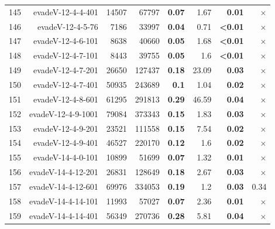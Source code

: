 \begin{longtable}{lrr@{\hskip 12pt}r@{\hskip 12pt}r@{\hskip 12pt}r@{\hskip 12pt}r@{\hskip 12pt}r}
145 & \multirow{1}{*}{evadeV-12-4-4-401} & \multirow{1}{*}{14507} & \multirow{1}{*}{67797} & \textbf{0.07} & 1.67 & \textbf{0.01} & $\times$ \\
146 & \multirow{1}{*}{evadeV-12-4-5-76} & \multirow{1}{*}{7186} & \multirow{1}{*}{33997} & \textbf{0.04} & 0.71 & \textbf{<0.01} & $\times$ \\
147 & \multirow{1}{*}{evadeV-12-4-6-101} & \multirow{1}{*}{8638} & \multirow{1}{*}{40660} & \textbf{0.05} & 1.68 & \textbf{<0.01} & $\times$ \\
148 & \multirow{1}{*}{evadeV-12-4-7-101} & \multirow{1}{*}{8443} & \multirow{1}{*}{39755} & \textbf{0.05} & 1.6 & \textbf{<0.01} & $\times$ \\
149 & \multirow{1}{*}{evadeV-12-4-7-201} & \multirow{1}{*}{26650} & \multirow{1}{*}{127437} & \textbf{0.18} & 23.09 & \textbf{0.03} & $\times$ \\
150 & \multirow{1}{*}{evadeV-12-4-7-401} & \multirow{1}{*}{50935} & \multirow{1}{*}{243689} & \textbf{0.1} & 1.04 & \textbf{0.02} & $\times$ \\
151 & \multirow{1}{*}{evadeV-12-4-8-601} & \multirow{1}{*}{61295} & \multirow{1}{*}{291813} & \textbf{0.29} & 46.59 & \textbf{0.04} & $\times$ \\
152 & \multirow{1}{*}{evadeV-12-4-9-1001} & \multirow{1}{*}{79084} & \multirow{1}{*}{373343} & \textbf{0.15} & 1.83 & \textbf{0.03} & $\times$ \\
153 & \multirow{1}{*}{evadeV-12-4-9-201} & \multirow{1}{*}{23521} & \multirow{1}{*}{111558} & \textbf{0.15} & 7.54 & \textbf{0.02} & $\times$ \\
154 & \multirow{1}{*}{evadeV-12-4-9-401} & \multirow{1}{*}{46527} & \multirow{1}{*}{220170} & \textbf{0.12} & 1.6 & \textbf{0.02} & $\times$ \\
155 & \multirow{1}{*}{evadeV-14-4-0-101} & \multirow{1}{*}{10899} & \multirow{1}{*}{51699} & \textbf{0.07} & 1.32 & \textbf{0.01} & $\times$ \\
156 & \multirow{1}{*}{evadeV-14-4-12-201} & \multirow{1}{*}{26831} & \multirow{1}{*}{128649} & \textbf{0.18} & 2.67 & \textbf{0.03} & $\times$ \\
157 & \multirow{1}{*}{evadeV-14-4-12-601} & \multirow{1}{*}{69976} & \multirow{1}{*}{334053} & \textbf{0.19} & 1.2 & \textbf{0.03} & 0.34 \\
158 & \multirow{1}{*}{evadeV-14-4-14-101} & \multirow{1}{*}{11993} & \multirow{1}{*}{57027} & \textbf{0.07} & 2.36 & \textbf{0.01} & $\times$ \\
159 & \multirow{1}{*}{evadeV-14-4-14-401} & \multirow{1}{*}{56349} & \multirow{1}{*}{270736} & \textbf{0.28} & 5.81 & \textbf{0.04} & $\times$ \\

\end{longtable}
